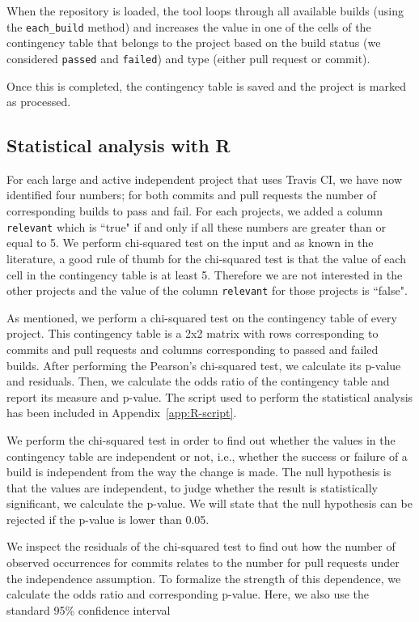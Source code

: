 	When the repository is loaded, the tool loops through all available builds (using the \texttt{each\_build} method) and increases the value in one of the cells of the contingency table that belongs to the project based on the build status (we considered \texttt{passed} and \texttt{failed}) and type (either pull request or commit).
	
	Once this is completed, the contingency table is saved and the project is marked as processed.

\subsection{Statistical analysis with R}
For each large and active independent project that uses Travis CI, we have now identified four numbers; for both commits and pull requests the number of corresponding builds to pass and fail.
For each projects, we added a column \texttt{relevant} which is ``true" if and only if all these numbers are greater than or equal to 5.
We perform chi-squared test on the input and as known in the literature, a good rule of thumb for the chi-squared test is that the value of each cell in the contingency table is at least 5.
Therefore we are not interested in the other projects and the value of the column \texttt{relevant} for those projects is ``false".

As mentioned, we perform a chi-squared test on the contingency table of every project.
This contingency table is a 2x2 matrix with rows corresponding to commits and pull requests and columns corresponding to passed and failed builds.
After performing the Pearson's chi-squared test, we calculate its p-value and residuals.
Then, we calculate the odds ratio of the contingency table and report its measure and p-value. 
The script used to perform the statistical analysis has been included in Appendix~\ref{app:R-script}.

We perform the chi-squared test in order to find out whether the values in the contingency table are independent or not, i.e., whether the success or failure of a build is independent from the way the change is made.
The null hypothesis is that the values are independent, to judge whether the result is statistically significant, we calculate the p-value.
We will state that the null hypothesis can be rejected if the p-value is lower than 0.05.

We inspect the residuals of the chi-squared test to find out how the number of observed occurrences for commits relates to the number for pull requests under the independence assumption.
To formalize the strength of this dependence, we calculate the odds ratio and corresponding p-value. 
Here, we also use the standard 95\% confidence interval

